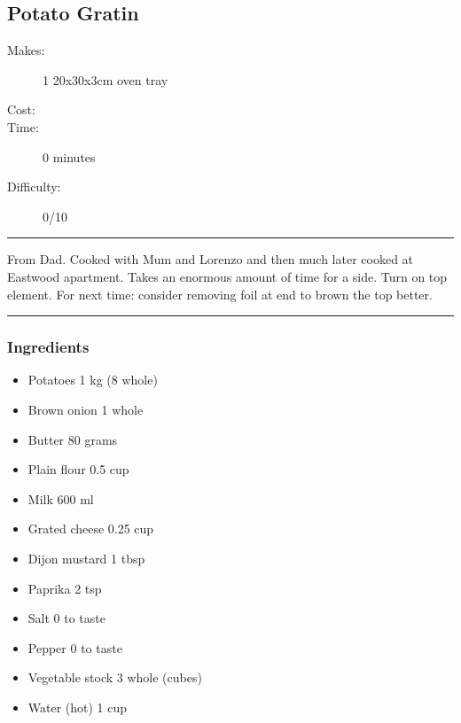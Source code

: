 \documentclass[]{article}
\begin{document}
\subsection*{\center\huge Potato Gratin}
\begin{description}
\item[Makes:] 1 20x30x3cm oven tray
\item[Cost:] \textdollar
\item[Time:] 0 minutes
\item[Difficulty:] 0/10
\end{description}
\vspace{0.2cm}\hrule\vspace{0.5cm}
\begin{adjustwidth}{0.5 cm}{0.5 cm}

From Dad. Cooked with Mum and Lorenzo and then much later cooked at Eastwood apartment. Takes an enormous amount of time for a side. Turn on top element. For next time: consider removing foil at end to brown the top better. \hfill{}\color{black}

\end{adjustwidth}
\vspace{0.5cm}\hrule
\subsubsection*{\Large Ingredients}
\begin{multicols}{2}
\begin{itemize}
 \item Potatoes \hfill 1 kg (8 whole)
 \item Brown onion \hfill 1 whole
 \item Butter \hfill 80 grams
 \item Plain flour \hfill 0.5 cup
 \item Milk \hfill 600 ml
 \item Grated cheese \hfill 0.25 cup
 \item Dijon mustard \hfill 1 tbsp
 \item Paprika \hfill 2 tsp
 \item Salt \hfill 0 to taste
 \item Pepper \hfill 0 to taste
 \item Vegetable stock \hfill 3 whole (cubes)
 \item Water (hot) \hfill 1 cup
\end{itemize}
\end{multicols}
\end{document}
